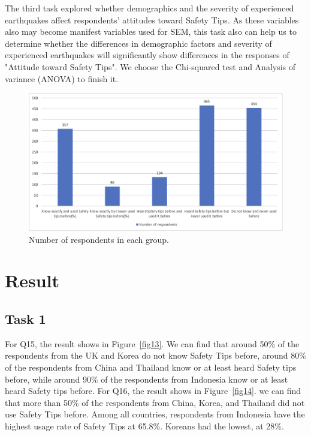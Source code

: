 The third task explored whether demographics and the severity of experienced earthquakes affect respondents' attitudes toward Safety Tips. As these variables also may become manifest variables used for SEM, this task also can help us to determine whether the differences in demographic factors and severity of experienced earthquakes will significantly show differences in the responses of "Attitude toward Safety Tips". We choose the Chi-squared test and Analysis of variance (ANOVA) to finish it.


\begin{figure}[h]
  \includegraphics[width=0.4\linewidth]{Figure/Figure6.jpg}
  \centering
  \caption{Number of respondents in each group. }
  \label{fig6}
\end{figure}




\section{Result}

\subsection{Task 1}
For Q15, the result shows in Figure~\ref{fig13}. We can find that around 50\% of the respondents from the UK and Korea do not know Safety Tips before, around 80\% of the respondents from China and Thailand know or at least heard Safety tips before, while around 90\% of the respondents from Indonesia know or at least heard Safety tips before. For Q16, the result shows in Figure~\ref{fig14}. we can find that more than 50\% of the respondents from China, Korea, and Thailand did not use Safety Tips before. Among all countries, respondents from Indonesia have the highest usage rate of Safety Tips at 65.8\%. Koreans had the lowest, at 28\%. 

